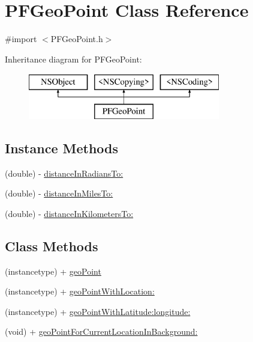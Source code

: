 \hypertarget{interface_p_f_geo_point}{}\section{P\+F\+Geo\+Point Class Reference}
\label{interface_p_f_geo_point}


{\ttfamily \#import $<$P\+F\+Geo\+Point.\+h$>$}

Inheritance diagram for P\+F\+Geo\+Point\+:\begin{figure}[H]
\begin{center}
\leavevmode
\includegraphics[height=2.000000cm]{interface_p_f_geo_point}
\end{center}
\end{figure}
\subsection*{Instance Methods}
\begin{DoxyCompactItemize}
\item 
(double) -\/ \hyperlink{interface_p_f_geo_point_a9e84a15ad35d119bbe35f5c7ea245d8e}{distance\+In\+Radians\+To\+:}
\begin{DoxyCompactList}\small\item\em 

 \end{DoxyCompactList}\item 
(double) -\/ \hyperlink{interface_p_f_geo_point_ac93b5ed940d57f1117b67038ca281c3e}{distance\+In\+Miles\+To\+:}
\item 
(double) -\/ \hyperlink{interface_p_f_geo_point_ab1417f34fe2b97f1a23de4b9751a8846}{distance\+In\+Kilometers\+To\+:}
\end{DoxyCompactItemize}
\subsection*{Class Methods}
\begin{DoxyCompactItemize}
\item 
(instancetype) + \hyperlink{interface_p_f_geo_point_ab2e96481fa9fdcb081ae7dbe7db8865f}{geo\+Point}
\begin{DoxyCompactList}\small\item\em 

 \end{DoxyCompactList}\item 
(instancetype) + \hyperlink{interface_p_f_geo_point_aafb7b4258d1a3730d425c4ab30478391}{geo\+Point\+With\+Location\+:}
\item 
(instancetype) + \hyperlink{interface_p_f_geo_point_a5340ac88e39a5a0149dce82ff206def4}{geo\+Point\+With\+Latitude\+:longitude\+:}
\item 
(void) + \hyperlink{interface_p_f_geo_point_aedd0b9e788cb44e49bcb213aa3baa173}{geo\+Point\+For\+Current\+Location\+In\+Background\+:}
\end{DoxyCompactItemize}
